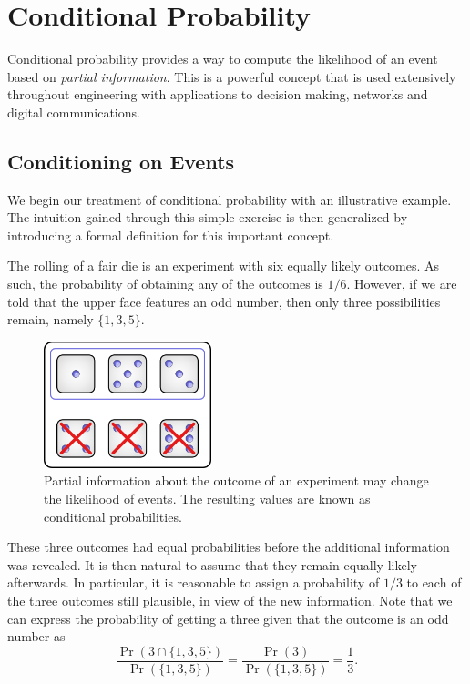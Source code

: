 \chapter{Conditional Probability}
\label{chapter:ConditionalProbability}

Conditional probability provides a way to compute the likelihood of an event based on \emph{partial information}.
This is a powerful concept that is used extensively throughout engineering with applications to decision making, networks and digital communications.


\section{Conditioning on Events}

We begin our treatment of conditional probability with an illustrative example.
The intuition gained through this simple exercise is then generalized by introducing a formal definition for this important concept.

\begin{example}
The rolling of a fair die is an experiment with six equally likely outcomes.
As such, the probability of obtaining any of the outcomes is $1/6$.
However, if we are told that the upper face features an odd number, then only three possibilities remain, namely $\{1, 3, 5 \}$.

\begin{figure}[htb!]
\begin{center}
\begin{psfrags}
\includegraphics[height=3.675cm]{Figures/3Chapter/condevent}
\end{psfrags}
\caption{Partial information about the outcome of an experiment may change the likelihood of events.
The resulting values are known as conditional probabilities.}
\label{figure:CondEvent}
\end{center}
\end{figure}

These three outcomes had equal probabilities before the additional information was revealed.
It is then natural to assume that they remain equally likely afterwards.
In particular, it is reasonable to assign a probability of $1/3$ to each of the three outcomes still plausible, in view of the new information.
Note that we can express the probability of getting a three given that the outcome is an odd number as
\begin{equation*}
\frac{\Pr (3 \cap \{ 1, 3, 5 \})}{\Pr (\{ 1, 3, 5 \} ) }
= \frac{\Pr(3)}{\Pr (\{1,3,5\})} = \frac{1}{3} .
\end{equation*}
\end{example}

